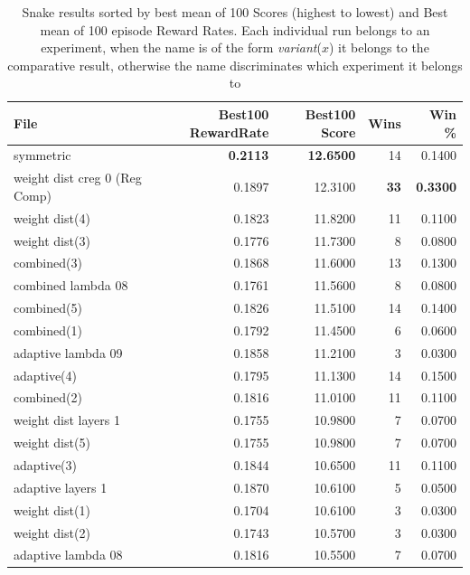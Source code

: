 \begin{table}[H]
\caption{Snake results sorted by best mean of 100 Scores (highest to lowest) and Best mean of 100 episode Reward Rates. Each individual run belongs to an experiment, when the name is of the form \emph{variant}($x$) it belongs to the comparative result, otherwise the name discriminates which experiment it belongs to}
\label{tab:snake-best100-score}
\begin{tabular}{l r r r r}
\hline
File & Best100 RewardRate & Best100 Score & Wins & Win \% \\
\hline
symmetric                             & \textbf{0.2113} & \textbf{12.6500} & 14 & 0.1400 \\
weight dist creg 0 (Reg Comp)         & 0.1897 & 12.3100 & \textbf{33} & \textbf{0.3300} \\
weight dist(4)                        & 0.1823 & 11.8200 & 11 & 0.1100 \\
weight dist(3)                        & 0.1776 & 11.7300 & 8  & 0.0800 \\
combined(3)                            & 0.1868 & 11.6000 & 13 & 0.1300 \\
combined lambda 08                     & 0.1761 & 11.5600 & 8  & 0.0800 \\
combined(5)                            & 0.1826 & 11.5100 & 14 & 0.1400 \\
combined(1)                            & 0.1792 & 11.4500 & 6  & 0.0600 \\
adaptive lambda 09                     & 0.1858 & 11.2100 & 3  & 0.0300 \\
adaptive(4)                            & 0.1795 & 11.1300 & 14 & 0.1500 \\
combined(2)                            & 0.1816 & 11.0100 & 11 & 0.1100 \\
weight dist layers 1                   & 0.1755 & 10.9800 & 7  & 0.0700 \\
weight dist(5)                         & 0.1755 & 10.9800 & 7  & 0.0700 \\
adaptive(3)                            & 0.1844 & 10.6500 & 11 & 0.1100 \\
adaptive layers 1                      & 0.1870 & 10.6100 & 5  & 0.0500 \\
weight dist(1)                         & 0.1704 & 10.6100 & 3  & 0.0300 \\
weight dist(2)                         & 0.1743 & 10.5700 & 3  & 0.0300 \\
adaptive lambda 08                     & 0.1816 & 10.5500 & 7  & 0.0700 \\

\end{tabular}
\end{table}
